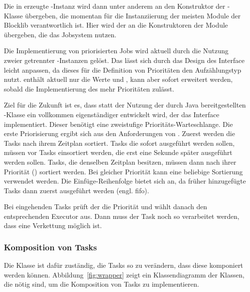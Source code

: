 Die in \classGame{} erzeugte \classBlocklibExecutor{}-Instanz wird dann unter anderem an den Konstruktor der \classContext{}-Klasse übergeben, die momentan für die Instanziierung der meisten Module der Blocklib verantwortlich ist. Hier wird der \classBlocklibExecutor{} an die Konstruktoren der Module übergeben, die das Jobsystem nutzen.

Die Implementierung von priorisierten Jobs wird aktuell durch die Nutzung zweier getrennter \classExecutor{}-Instanzen gelöst. Das lässt sich durch das Design des Interface \classBlocklibExecutorService{} leicht anpassen, da dieses für die Definition von Prioritäten den Aufzählungstyp \classTaskPriority{} nutzt. \classTaskPriority{} enthält aktuell nur die Werte  und , kann aber sofort erweitert werden, sobald die Implementierung des \classBlocklibExecutorService{} mehr Prioritäten zulässt. 

Ziel für die Zukunft ist es, dass statt der Nutzung der durch Java bereitgestellten \classScheduledThreadPoolExecutor{}-Klasse ein vollkommen eigenständiger \classExecutorService{} entwickelt wird, der das Interface \classBlocklibExecutorService{} implementiert. Dieser benötigt eine zweistufige Prioritäts-Warteschlange. Die erste Priorisierung ergibt sich aus den Anforderungen von \classScheduledExecutorService{}. Zuerst werden die Tasks nach ihrem Zeitplan sortiert. Tasks die sofort ausgeführt werden sollen, müssen vor Tasks einsortiert werden, die erst eine Sekunde später ausgeführt werden sollen. Tasks, die denselben Zeitplan besitzen, müssen dann nach ihrer Priorität (\classTaskPriority{}) sortiert werden. Bei gleicher Priorität kann eine beliebige Sortierung verwendet werden. Die Einfüge-Reihenfolge bietet sich an, da früher hinzugefügte Tasks dann zuerst ausgeführt werden (engl. \ac{fifo}).

Bei eingehenden Tasks prüft der \classBlocklibExecutor{} die Priorität und wählt danach den entsprechenden Executor aus. Dann muss der Task noch so verarbeitet werden, dass eine Verkettung möglich ist.

\subsubsection{Komposition von Tasks}\label{sec:Verkettung}
Die Klasse \classCompletableFutureWrapper{} ist dafür zuständig, die Tasks so zu verändern, dass diese komponiert werden können. Abbildung~\vref{fig:wrapper} zeigt ein Klassendiagramm der Klassen, die nötig sind, um die Komposition von Tasks zu implementieren. 

